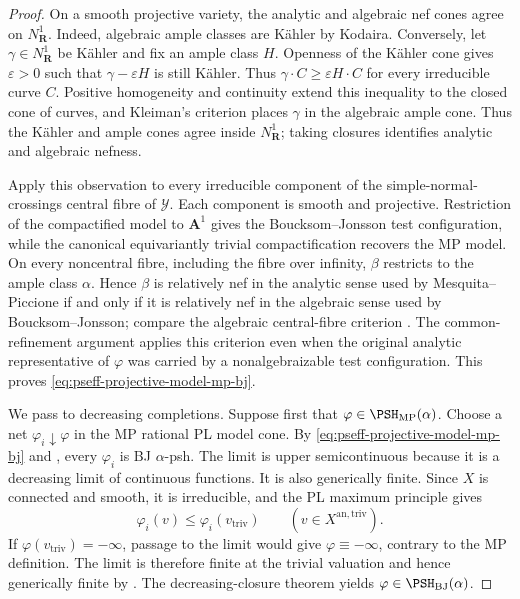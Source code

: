\begin{proof}
On a smooth projective variety, the analytic and algebraic nef cones agree
on $N^1_{\mathbf R}$.  Indeed, algebraic ample classes are K\"ahler by
Kodaira.  Conversely, let $\gamma\in N^1_{\mathbf R}$ be K\"ahler and
fix an ample class $H$.  Openness of the K\"ahler cone gives
$\varepsilon>0$ such that $\gamma-\varepsilon H$ is still K\"ahler.
Thus $\gamma\cdot C\geq\varepsilon H\cdot C$ for every irreducible
curve $C$.  Positive homogeneity and continuity extend this inequality
to the closed cone of curves, and Kleiman's criterion places $\gamma$
in the algebraic ample cone.  Thus the K\"ahler and ample cones agree
inside $N^1_{\mathbf R}$; taking closures identifies analytic and
algebraic nefness.

Apply this observation to every irreducible component of the
simple-normal-crossings central fibre of $\mathcal Y$.  Each component
is smooth and projective.  Restriction of the compactified model to
$\mathbf A^1$ gives the Boucksom--Jonsson test configuration, while the
canonical equivariantly trivial compactification recovers the MP model.
On every noncentral fibre, including the fibre over infinity,
$\beta$ restricts to the ample class $\alpha$.  Hence $\beta$ is
relatively nef in the analytic sense used by Mesquita--Piccione if and
only if it is relatively nef in the algebraic sense used by
Boucksom--Jonsson; compare the algebraic central-fibre criterion
\cite[Lemma~3.1]{BJ22}.  The common-refinement argument applies this
criterion even when the original analytic representative of $\varphi$
was carried by a nonalgebraizable test configuration.  This proves
\eqref{eq:pseff-projective-model-mp-bj}.

We pass to decreasing completions.  Suppose first that
$\varphi\in\PSH_{\mathrm{MP}}(\alpha)$.  Choose a net
$\varphi_i\downarrow\varphi$ in the MP rational PL model cone.  By
\eqref{eq:pseff-projective-model-mp-bj} and
\cite[Lemma~4.3]{BJ22}, every $\varphi_i$ is BJ
$\alpha$-psh.  The limit is upper semicontinuous because it is a
decreasing limit of continuous functions.  It is also generically finite.
Since $X$ is connected and smooth, it is irreducible, and the PL maximum
principle \cite[Proposition~3.6(iv)]{BJ22} gives
\[
                  \varphi_i(v)\leq\varphi_i(v_{\mathrm{triv}})
                  \qquad(v\in X^{\mathrm{an,triv}}).
\]
If $\varphi(v_{\mathrm{triv}})=-\infty$, passage to the limit would give
$\varphi\equiv-\infty$, contrary to the MP definition.  The limit is
therefore finite at the trivial valuation and hence generically finite by
\cite[Lemma~1.4(ii)]{BJ22}.  The decreasing-closure theorem
\cite[Theorem~4.5]{BJ22} yields
$\varphi\in\PSH_{\mathrm{BJ}}(\alpha)$.


\end{proof}
